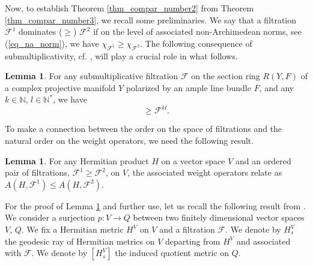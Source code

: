 \documentclass[12pt]{article}
\numberwithin{equation}{section}
\theoremstyle{theorem}
\theoremstyle{definition}
\newtheorem{lem}[thm]{Lemma}
\theoremstyle{remark}
\newcommand{\nat}{\mathbb{N}}
\begin{document}
	
	
	\par 
	Now, to establish Theorem \ref{thm_compar_number2} from Theorem \ref{thm_compar_number3}, we recall some preliminaries.
	We say that a filtration $\mathcal{F}^1$ dominates ($\geq$) $\mathcal{F}^2$ if on the level of associated non-Archimedean norms, see (\ref{eq_na_norm}), we have $\chi_{\mathcal{F}^1} \geq \chi_{\mathcal{F}^2}$.
	The following consequence of submultiplicativity, cf. \cite[\S 3.1]{FinNarSim}, will play a crucial role in what follows.
	\begin{lem}\label{lem_rest_subm}
		For any submultiplicative filtration $\mathcal{F}$ on the section ring $R(Y, F)$ of a complex projective manifold $Y$ polarized by an ample line bundle $F$, and any $k \in \nat$, $l \in \nat^*$, we have
		\begin{equation}
			[ {\rm{Sym}}^l \mathcal{F}^k ] 
			\geq 
			\mathcal{F}^{kl}.
		\end{equation}
	\end{lem}
	\par 
	To make a connection between the order on the space of filtrations and the natural order on the weight operators, we need the following result.
	\begin{lem}\label{lem_mon_numb_oper}
		For any Hermitian product $H$ on a vector space $V$ and an ordered pair of filtrations, $\mathcal{F}^1 \geq \mathcal{F}^2$, on $V$, the associated weight operators relate as $A(H, \mathcal{F}^1) \leq A(H, \mathcal{F}^2)$.
	\end{lem}
	\par
	For the proof of Lemma \ref{lem_mon_numb_oper} and further use, let us recall the following result from \cite[Proposition 4.12]{FinTits}.
	We consider a surjection $p : V \to Q$ between two finitely dimensional vector spaces $V$, $Q$.
	We fix a Hermitian metric $H^V$ on $V$ and a filtration $\mathcal{F}$. 
	We denote by $H_s^V$ the geodesic ray of Hermitian metrics on $V$ departing from $H^V$ and associated with $\mathcal{F}$.
	We denote by $[H_s^V]$ the induced quotient metric on $Q$.
\end{document}
